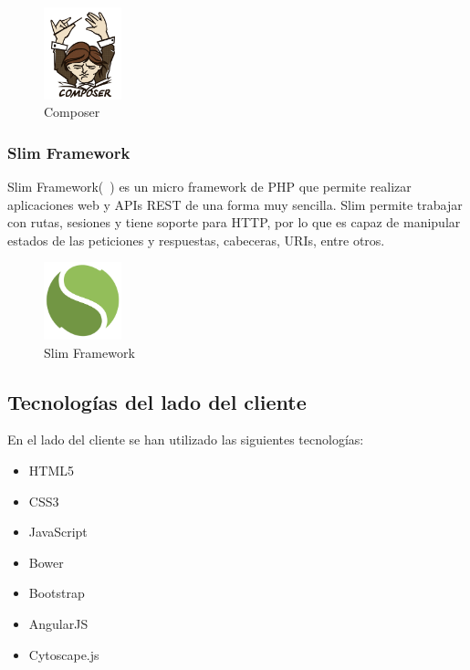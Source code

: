 \begin{figure}[tbh]
\centering
\label{fig:composer}
\includegraphics[width=0.2\textwidth]{imagenes/composer}
\caption{Composer}
\end{figure}

\subsubsection*{Slim Framework}

Slim Framework(~\cite{slim}) es un micro framework de PHP que permite realizar aplicaciones web y APIs REST de una forma muy sencilla. Slim permite trabajar con rutas, sesiones y tiene soporte para HTTP, por lo que es capaz de manipular estados de las peticiones y respuestas, cabeceras, URIs, entre otros.

\begin{figure}[tbh]
\centering
\label{fig:slim}
\includegraphics[width=0.2\textwidth]{imagenes/slim}
\caption{Slim Framework}
\end{figure}

\subsection{Tecnologías del lado del cliente}

En el lado del cliente se han utilizado las siguientes tecnologías:

\begin{itemize}
\item HTML5
\item CSS3
\item JavaScript
\item Bower
\item Bootstrap
\item AngularJS
\item Cytoscape.js
\end{itemize}

